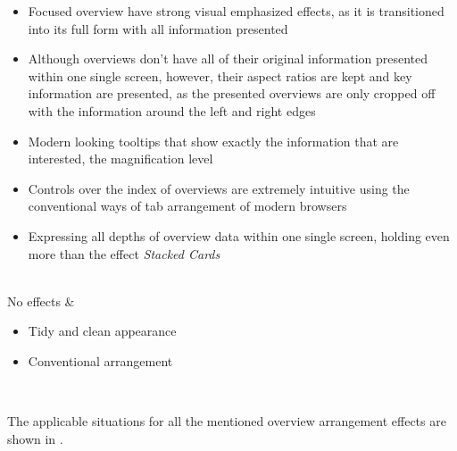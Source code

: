\begin{tabu}
\begin{itemize}
        \item Focused overview have strong visual emphasized effects, as it is transitioned into its full form with all information presented
        \item Although overviews don't have all of their original information presented within one single screen, however, their aspect ratios are kept and key information are presented, as the presented overviews are only cropped off with the information around the left and right edges
        \item Modern looking tooltips that show exactly the information that are interested, the magnification level
        \item Controls over the index of overviews are extremely intuitive using the conventional ways of tab arrangement of modern browsers
        \item Expressing all depths of overview data within one single screen, holding even more than the effect \emph{Stacked Cards}
    \end{itemize} \\
    \hline
    No effects &
    \vspace{.85em}\begin{itemize}
        \item Tidy and clean appearance
        \item Conventional arrangement
    \end{itemize} \\
    \hline
\end{tabu}
\label{tbl:overview:exp}
\endgroup

The applicable situations for all the mentioned overview arrangement effects are shown in .

